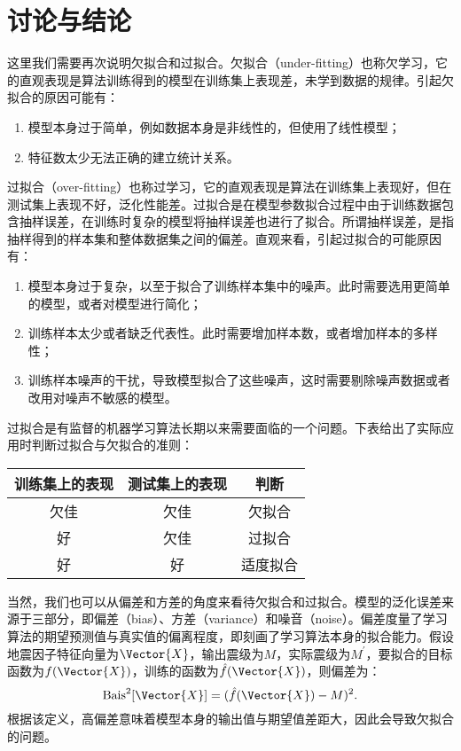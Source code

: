 \section{讨论与结论}\label{sec:讨论与结论}

这里我们需要再次说明欠拟合和过拟合。欠拟合（under-fitting）也称欠学习，它的直观表现是算法训练得到的模型在训练集上表现差，未学到数据的规律。引起欠拟合的原因可能有：
\begin{enumerate}
    \item 模型本身过于简单，例如数据本身是非线性的，但使用了线性模型；
    \item 特征数太少无法正确的建立统计关系。
\end{enumerate}

过拟合（over-fitting）也称过学习，它的直观表现是算法在训练集上表现好，但在测试集上表现不好，泛化性能差。过拟合是在模型参数拟合过程中由于训练数据包含抽样误差，在训练时复杂的模型将抽样误差也进行了拟合。所谓抽样误差，是指抽样得到的样本集和整体数据集之间的偏差。直观来看，引起过拟合的可能原因有：
\begin{enumerate}
    \item 模型本身过于复杂，以至于拟合了训练样本集中的噪声。此时需要选用更简单的模型，或者对模型进行简化；
    \item 训练样本太少或者缺乏代表性。此时需要增加样本数，或者增加样本的多样性；
    \item 训练样本噪声的干扰，导致模型拟合了这些噪声，这时需要剔除噪声数据或者改用对噪声不敏感的模型。
\end{enumerate}

过拟合是有监督的机器学习算法长期以来需要面临的一个问题。下表给出了实际应用时判断过拟合与欠拟合的准则：
\begin{table}[!htbp]
    \label{tab:seism_overfit}
    \centering
    \footnotesize
    \setlength{\tabcolsep}{5pt}
    \renewcommand{\arraystretch}{1}
    \begin{tabular}{ccc}
        \toprule
        训练集上的表现 & 测试集上的表现 & 判断 \\
        \midrule
        欠佳 & 欠佳 & 欠拟合 \\
        好 & 欠佳 & 过拟合 \\
        好 & 好 & 适度拟合 \\
        \bottomrule
    \end{tabular}
\end{table}

当然，我们也可以从偏差和方差的角度来看待欠拟合和过拟合。模型的泛化误差来源于三部分，即偏差（bias）、方差（variance）和噪音（noise）。偏差度量了学习算法的期望预测值与真实值的偏离程度，即刻画了学习算法本身的拟合能力。假设地震因子特征向量为$\Vector{X}$，输出震级为$M$，实际震级为$M^{\prime}$，要拟合的目标函数为$f(\Vector{X})$，训练的函数为$\hat{f}(\Vector{X})$，则偏差为：
\begin{equation}
  \mathrm{Bais}^2[\Vector{X}]=(\hat{f}(\Vector{X})-M)^2.
\end{equation}
根据该定义，高偏差意味着模型本身的输出值与期望值差距大，因此会导致欠拟合的问题。

